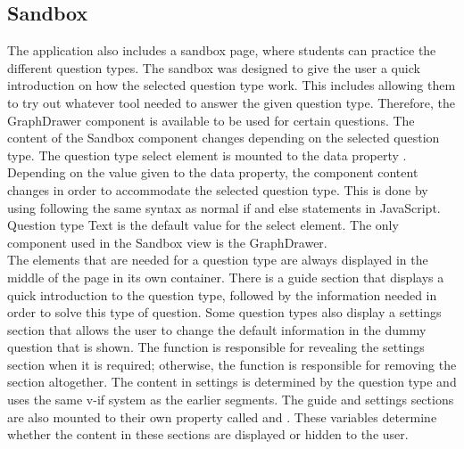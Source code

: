 \subsection{Sandbox}
The application also includes a sandbox page, where students can practice the different question types. The sandbox was designed to give the user a quick introduction on how the selected question type work. This includes allowing them to try out whatever tool needed to answer the given question type. Therefore, the GraphDrawer component is available to be used for certain questions. The content of the Sandbox component changes depending on the selected question type. The question type select element is mounted to the data property . Depending on the value given to the  data property, the component content changes in order to accommodate the selected question type. This is done by using  following the same syntax as normal if and else statements in JavaScript. Question type Text is the default value for the select element. The only component used in the Sandbox view is the GraphDrawer.
\\[11pt]
The elements that are needed for a question type are always displayed in the middle of the page in its own container. There is a guide section that displays a quick introduction to the question type, followed by the information needed in order to solve this type of question. Some question types also display a settings section that allows the user to change the default information in the dummy question that is shown. The  function is responsible for revealing the settings section when it is required; otherwise, the function is responsible for removing the section altogether.  The content in settings is determined by the question type and uses the same v-if system as the earlier segments. The guide and settings sections are also mounted to their own property called  and . These variables determine whether the content in these sections are displayed or hidden to the user.
